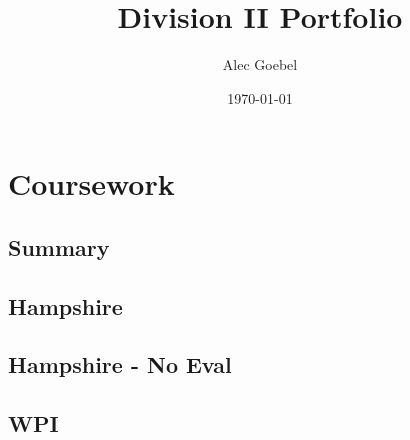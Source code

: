 \documentclass[letterpaper,twoside]{report}
\title{Division II Portfolio}
\author{Alec Goebel}
\date{\today}
\begin{document}
\maketitle
\tableofcontents




 
\part{Coursework}

\chapter{Summary}

\chapter{Hampshire}













\chapter{Hampshire - No Eval}





\chapter{WPI}










\end{document}
